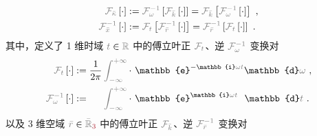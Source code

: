 \begin{subequations} \label{eq:FT-xkappa}
	\abovedisplayskip=10pt
	\belowdisplayskip=12pt
\begin{align}
	\mathcolor{gray}{\mathcal F_{\bar{\kappa}}} \left[ \cdot \right] &:= \mathcolor{gray}{\mathcal F_{\omega}^{-1}} \left[ \mathcolor{gray}{\mathcal F_{\bar{k}}} \left[ \cdot \right] \right] = \mathcolor{gray}{\mathcal F_{\bar{k}}} \left[ \mathcolor{gray}{\mathcal F_{\omega}^{-1}} \left[ \cdot \right] \right] ~, \label{eq:FT-kappa} \\
	\mathcolor{gray}{\mathcal F_{\bar{x}}^{-1}} \left[ \cdot \right] &:= \mathcolor{gray}{\mathcal F_{t}} \left[ \mathcolor{gray}{\mathcal F_{\bar{r}}^{-1}} \left[ \cdot \right] \right] = \mathcolor{gray}{\mathcal F_{\bar{r}}^{-1}} \left[ \mathcolor{gray}{\mathcal F_{t}} \left[ \cdot \right] \right] ~. \label{eq:IFT-x}
\end{align}
\end{subequations}
其中，定义了 1 维时域 $\mathcolor{gray}{t} \in \mathcolor{gray}{\mathbb{R}}$ 中的傅立叶正 $\mathcolor{gray}{\mathcal F_{t}}$、逆 $\mathcolor{gray}{\mathcal F_{\omega}^{-1}}$ 变换对
\begin{subequations} \label{eq:FT-tw}
	\abovedisplayskip=10pt
	\belowdisplayskip=12pt
\begin{align}
	\mathcolor{gray}{\mathcal F_{t}} \left[ \cdot \right] &:= \frac{ 1 }{ 2\pi } \mathcolor{gray}{\int_{-\infty}^{+\infty}} \cdot~ \mathbb{e}^{-\mathbb{i}\mathcolor{gray}{\omega} \mathcolor{gray}{t}} \mathbb{d}\mathcolor{gray}{\omega} ~, \label{eq:FT-t} \\
	\mathcolor{gray}{\mathcal F_{\omega}^{-1}} \left[ \cdot \right] &:= \hphantom{\frac{ 1 }{ 2\pi }} \mathcolor{gray}{\int_{-\infty}^{+\infty}} \cdot~ \mathbb{e}^{\mathbb{i}\mathcolor{gray}{\omega} \mathcolor{gray}{t}} \hphantom{^-} \mathbb{d}\mathcolor{gray}{t} ~. \label{eq:IFT-w}
\end{align}
\end{subequations}
以及 3 维空域 $\mathcolor{gray}{\bar{r}} \in \mathcolor{gray}{\bar{\mathbb{R}}_{\textcolor{Maroon}{3}}}$ 中的傅立叶正 $\mathcolor{gray}{\mathcal F_{\bar{k}}}$、逆 $\mathcolor{gray}{\mathcal F_{\bar{r}}^{-1}}$ 变换对
